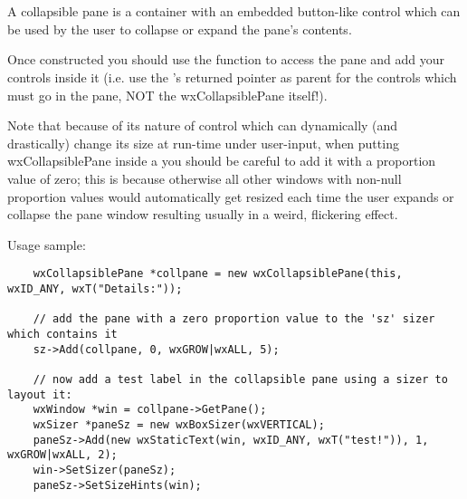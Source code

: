 
\section{}\label{wxcollapsiblepane}

A collapsible pane is a container with an embedded button-like control which can be
used by the user to collapse or expand the pane's contents.

Once constructed you should use the 
function to access the pane and add your controls inside it (i.e. use the
's returned pointer as parent for the
controls which must go in the pane, NOT the wxCollapsiblePane itself!).

Note that because of its nature of control which can dynamically (and drastically)
change its size at run-time under user-input, when putting wxCollapsiblePane inside
a  you should be careful to add it with a proportion value
of zero; this is because otherwise all other windows with non-null proportion values
would automatically get resized each time the user expands or collapse the pane window
resulting usually in a weird, flickering effect.

Usage sample:

\begin{verbatim}
    wxCollapsiblePane *collpane = new wxCollapsiblePane(this, wxID_ANY, wxT("Details:"));

    // add the pane with a zero proportion value to the 'sz' sizer which contains it
    sz->Add(collpane, 0, wxGROW|wxALL, 5);

    // now add a test label in the collapsible pane using a sizer to layout it:
    wxWindow *win = collpane->GetPane();
    wxSizer *paneSz = new wxBoxSizer(wxVERTICAL);
    paneSz->Add(new wxStaticText(win, wxID_ANY, wxT("test!")), 1, wxGROW|wxALL, 2);
    win->SetSizer(paneSz);
    paneSz->SetSizeHints(win);

\end{verbatim}


